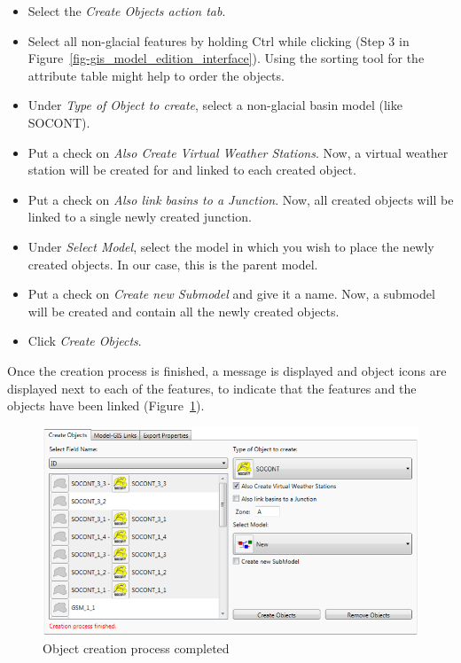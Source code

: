 \documentclass[
  letterpaper,
  DIV=11,
  numbers=noendperiod]{scrreprt}
\begin{document}
\begin{itemize}
\item
  {Select the \emph{Create Objects action tab}.}
\item
  {Select all non-glacial features by holding Ctrl while clicking (Step
  3 in Figure~\ref{fig-gis_model_edition_interface}). Using the sorting
  tool for the attribute table might help to order the objects.}
\item
  {Under \emph{Type of Object to create}, select a non-glacial basin
  model (like SOCONT).}
\item
  {Put a check on \emph{Also Create Virtual Weather Stations}.} Now, a
  virtual weather station will be created for and linked to each created
  object.
\item
  {Put a check on \emph{Also link basins to a Junction}.} Now, all
  created objects will be linked to a single newly created junction.
\item
  {Under \emph{Select Model}, select the model in which you wish to
  place the newly created objects. In our case, this is the parent
  model.}
\item
  {Put a check on \emph{Create new Submodel} and give it a name.} Now, a
  submodel will be created and contain all the newly created objects.
\item
  {Click \emph{Create Objects}.}
\end{itemize}

Once the creation process is finished, a message is displayed and object
icons are displayed next to each of the features, to indicate that the
features and the objects have been linked
(Figure~\ref{fig-gis_object_creation_process}).

\begin{figure}

{\centering \includegraphics{./figures/fig-gis_object_creation_process.png}

}

\caption{\label{fig-gis_object_creation_process}Object creation process
completed}

\end{figure}
\end{document}
